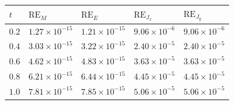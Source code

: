 \begin{tabular}{lllll}
\toprule
$t$ & $\mathrm{RE}_M$ & $\mathrm{RE}_E$ & $\mathrm{RE}_{J_x}$ & $\mathrm{RE}_{J_y}$ \\
\midrule
\(0.2\) & \(1.27\times10^{-15}\) & \(1.21\times10^{-15}\) & \(9.06\times10^{-6}\) & \(9.06\times10^{-6}\) \\
\(0.4\) & \(3.03\times10^{-15}\) & \(3.22\times10^{-15}\) & \(2.40\times10^{-5}\) & \(2.40\times10^{-5}\) \\
\(0.6\) & \(4.62\times10^{-15}\) & \(4.83\times10^{-15}\) & \(3.63\times10^{-5}\) & \(3.63\times10^{-5}\) \\
\(0.8\) & \(6.21\times10^{-15}\) & \(6.44\times10^{-15}\) & \(4.45\times10^{-5}\) & \(4.45\times10^{-5}\) \\
\(1.0\) & \(7.81\times10^{-15}\) & \(7.85\times10^{-15}\) & \(5.06\times10^{-5}\) & \(5.06\times10^{-5}\) \\
\bottomrule
\end{tabular}
